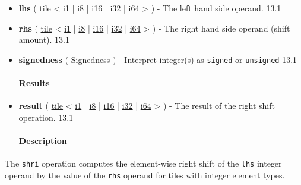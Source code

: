 \documentclass{article}
\begin{document}
\begin{itemize}
\item \textbf{lhs} ( \href{https://docs.nvidia.com/cuda/tile-ir/latest/sections/types.html#type-tile}{tile} < \href{https://docs.nvidia.com/cuda/tile-ir/latest/sections/types.html#subsection-element-types}{i1} | \href{https://docs.nvidia.com/cuda/tile-ir/latest/sections/types.html#subsection-element-types}{i8} | \href{https://docs.nvidia.com/cuda/tile-ir/latest/sections/types.html#subsection-element-types}{i16} | \href{https://docs.nvidia.com/cuda/tile-ir/latest/sections/types.html#subsection-element-types}{i32} | \href{https://docs.nvidia.com/cuda/tile-ir/latest/sections/types.html#subsection-element-types}{i64} > ) - The left hand side operand. 13.1
\item \textbf{rhs} ( \href{https://docs.nvidia.com/cuda/tile-ir/latest/sections/types.html#type-tile}{tile} < \href{https://docs.nvidia.com/cuda/tile-ir/latest/sections/types.html#subsection-element-types}{i1} | \href{https://docs.nvidia.com/cuda/tile-ir/latest/sections/types.html#subsection-element-types}{i8} | \href{https://docs.nvidia.com/cuda/tile-ir/latest/sections/types.html#subsection-element-types}{i16} | \href{https://docs.nvidia.com/cuda/tile-ir/latest/sections/types.html#subsection-element-types}{i32} | \href{https://docs.nvidia.com/cuda/tile-ir/latest/sections/types.html#subsection-element-types}{i64} > ) - The right hand side operand (shift amount). 13.1
\item \textbf{signedness} ( \href{https://docs.nvidia.com/cuda/tile-ir/latest/sections/operations.html#op-attribute-cuda-tile-shri-signedness-attr}{Signedness} ) - Interpret integer(s) as \texttt{signed} or \texttt{unsigned} 13.1


\paragraph{Results}

\item \textbf{result} ( \href{https://docs.nvidia.com/cuda/tile-ir/latest/sections/types.html#type-tile}{tile} < \href{https://docs.nvidia.com/cuda/tile-ir/latest/sections/types.html#subsection-element-types}{i1} | \href{https://docs.nvidia.com/cuda/tile-ir/latest/sections/types.html#subsection-element-types}{i8} | \href{https://docs.nvidia.com/cuda/tile-ir/latest/sections/types.html#subsection-element-types}{i16} | \href{https://docs.nvidia.com/cuda/tile-ir/latest/sections/types.html#subsection-element-types}{i32} | \href{https://docs.nvidia.com/cuda/tile-ir/latest/sections/types.html#subsection-element-types}{i64} > ) - The result of the right shift operation. 13.1


\paragraph{Description}

\end{itemize}
The \texttt{shri} operation computes the element-wise right shift of the \texttt{lhs} integer operand by the value of the \texttt{rhs} operand for tiles with integer element types.
\end{document}
